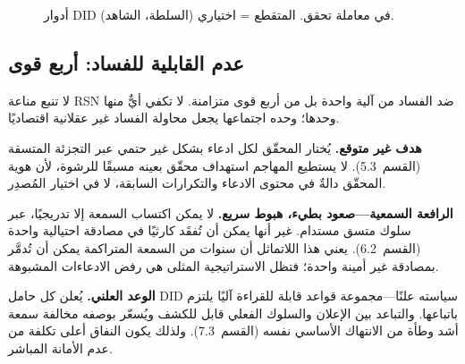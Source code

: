 \documentclass[11pt,a4paper,twocolumn]{article}
\begin{document}
\begin{figure}[ht]
\centering
{}
\caption{أدوار DID في معاملة تحقق. المتقطع = اختياري (السلطة، الشاهد).}
\label{fig:roles}
\end{figure}

\subsection{عدم القابلية للفساد: أربع قوى}

لا تنبع مناعة RSN ضد الفساد من آلية واحدة بل من أربع قوى متزامنة. لا تكفي أيٌّ منها وحدها؛ وحده اجتماعها يجعل محاولة الفساد غير عقلانية اقتصاديًا.

\textbf{هدف غير متوقع.} يُختار المحقّق لكل ادعاء بشكل غير حتمي عبر التجزئة المتسقة (القسم~5.3). لا يستطيع المهاجم استهداف محقّق بعينه مسبقًا للرشوة، لأن هوية المحقّق دالةٌ في محتوى الادعاء والتكرارات السابقة، لا في اختيار المُصدِر.

\textbf{الرافعة السمعية---صعود بطيء، هبوط سريع.} لا يمكن اكتساب السمعة إلا تدريجيًا، عبر سلوك متسق مستدام. غير أنها يمكن أن تُفقَد كارثيًا في مصادقة احتيالية واحدة (القسم~6.2). يعني هذا اللاتماثل أن سنوات من السمعة المتراكمة يمكن أن تُدمَّر بمصادقة غير أمينة واحدة؛ فتظل الاستراتيجية المثلى هي رفض الادعاءات المشبوهة.

\textbf{الوعد العلني.} يُعلن كل حامل DID سياسته علنًا---مجموعة قواعد قابلة للقراءة آليًا يلتزم باتباعها. والتباعد بين الإعلان والسلوك الفعلي قابل للكشف ويُسعّر بوصفه مخالفة سمعة أشد وطأة من الانتهاك الأساسي نفسه (القسم~7.3). ولذلك يكون النفاق أعلى تكلفة من عدم الأمانة المباشر.
\end{document}
